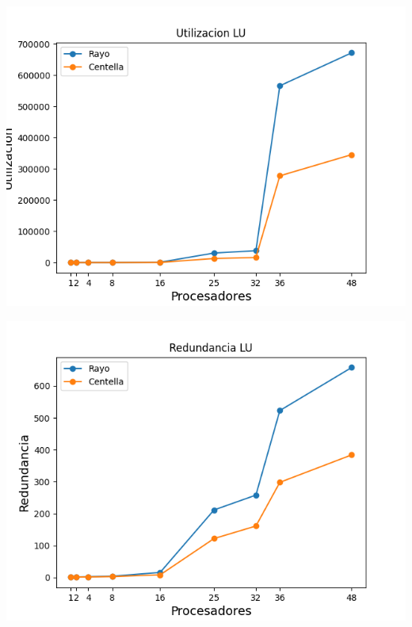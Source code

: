 \begin{center}
 \centering
  \begin{minipage}[b]{.49\textwidth}
  \includegraphics[width=1\linewidth]{plots/utilizacion-lu.png}
 \end{minipage}
 \begin{minipage}[b]{.49\textwidth}
  \includegraphics[width=1\linewidth]{plots/redundancy-lu.png}
 \end{minipage}
\end{center}

